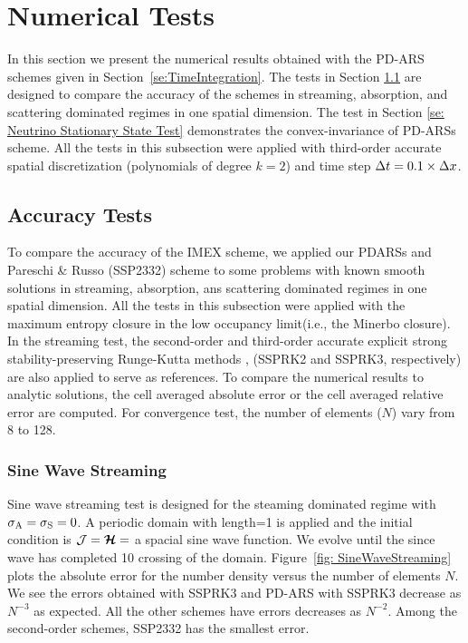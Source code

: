 \section{Numerical Tests}\label{se:NumericalTests}

In this section we present the numerical results obtained with the PD-ARS schemes given in Section~\ref{se:TimeIntegration}.
The tests in Section \ref{se: Accuracy Tests} are designed to compare the accuracy of the schemes in streaming, absorption, and scattering dominated regimes in one spatial dimension.
The test in Section \ref{se: Neutrino Stationary State Test} demonstrates the convex-invariance of PD-ARSs scheme.
All the tests in this subsection were applied with third-order accurate spatial discretization (polynomials of degree $k=2$) and time step $\Delta t = 0.1 \times \Delta x $.

\subsection{Accuracy Tests}
\label{se: Accuracy Tests}
To compare the accuracy of the IMEX scheme, we applied our PDARSs and Pareschi \& Russo \cite{pareschiRusso_2005} (SSP2332) scheme to some problems with known smooth solutions in streaming, absorption, ans scattering dominated regimes in one spatial dimension.
All the tests in this subsection were applied with the maximum entropy closure in the low occupancy limit(i.e., the Minerbo closure).
In the streaming test, the second-order and third-order accurate explicit strong stability-preserving Runge-Kutta methods\cite{gottlieb_etal_2001} , (SSPRK2 and SSPRK3, respectively) are also applied to serve as references.
To compare the numerical results to analytic solutions, the cell averaged absolute error or the cell averaged relative error are computed.
For convergence test, the number of elements ($N$) vary from 8 to 128.

\subsubsection{Sine Wave Streaming}
Sine wave streaming test is designed for the steaming dominated regime with $\sigma_{{\rm A}} = \sigma_{{\rm S}} = 0$.
A periodic domain with length=1 is applied and the initial condition is $\mathcal{J} = \boldsymbol{\mathcal{H}} =$ a spacial sine wave function.
We evolve until the since wave has completed 10 crossing of the domain.
Figure~\ref{fig: SineWaveStreaming} plots the absolute error for the number density versus the number of elements $N$.
We see the errors obtained with SSPRK3 and PD-ARS with SSPRK3 decrease as $N^{-3}$ as expected.
All the other schemes have errors decreases as $N^{-2}$.
Among the second-order schemes, SSP2332 has the smallest error.

